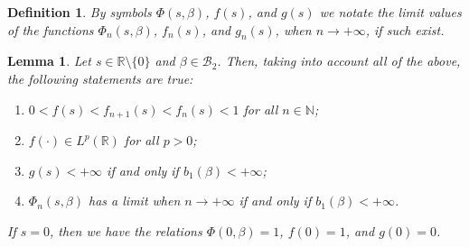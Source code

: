 \documentclass[a4paper]{article}
\newtheorem{lemma}{Lemma}
\newtheorem{deff}{Definition}
\begin{document}
\begin{deff}\label{34-d-1}
By symbols $\Phi(s,\beta)$, $f(s)$, and $g(s)$ we notate the limit values of the functions $\Phi_n(s,\beta)$, $f_n(s)$, and $g_n(s)$, when $n\to+\infty$, if such exist.
\end{deff}
\begin{lemma}\label{34-l-2} Let $s\in\mathbb{R}\setminus\{0\}$ and $\beta\in\mathcal{B}_2$. Then, taking into account all of the above, the following statements are true:
	\begin{enumerate}
		\item $0<f(s)<f_{n+1}(s)< f_{n}(s)<1$ for all $n\in\mathbb{N}$;
		\item $f(\cdot)\in L^p(\mathbb{R})$ for all $p>0$;
		\item $g(s)<+\infty$ if and only if $b_1(\beta)<+\infty$;
		\item $\Phi_n(s,\beta)$ has a limit when $n\to+\infty$ if and only if $b_1(\beta)<+\infty$.
	\end{enumerate}
If $s=0$, then we have the relations $\Phi(0,\beta)=1$, $f(0)=1$, and $g(0)=0$.
\end{lemma}
\end{document}
